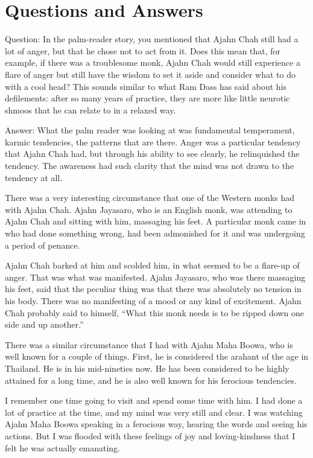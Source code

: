 \chapter{Questions and Answers}

\qaspace
Question: In the palm-reader story, you mentioned that Ajahn Chah still
had a lot of anger, but that he chose not to act from it. Does this mean
that, for example, if there was a troublesome monk, Ajahn Chah would
still experience a flare of anger but still have the wisdom to set it
aside and consider what to do with a cool head? This sounds similar to
what Ram Dass has said about his defilements: after so many years of
practice, they are more like little neurotic shmoos that he can relate
to in a relaxed way.

\qaspace
Answer: What the palm reader was looking at was fundamental temperament,
karmic tendencies, the patterns that are there. Anger was a particular
tendency that Ajahn Chah had, but through his ability to see clearly, he
relinquished the tendency. The awareness had such clarity that the mind
was not drawn to the tendency at all.

There was a very interesting circumstance that one of the Western monks
had with Ajahn Chah. Ajahn Jayasaro, who is an English monk, was
attending to Ajahn Chah and sitting with him, massaging his feet. A
particular monk came in who had done something wrong, had been
admonished for it and was undergoing a period of penance.

Ajahn Chah barked at him and scolded him, in what seemed to be a
flare-up of anger. That was what was manifested. Ajahn Jayasaro, who was
there massaging his feet, said that the peculiar thing was that there
was absolutely no tension in his body. There was no manifesting of a
mood or any kind of excitement. Ajahn Chah probably said to himself,
“What this monk needs is to be ripped down one side and up another.”

There was a similar circumstance that I had with Ajahn Maha Boowa, who
is well known for a couple of things. First, he is considered the
arahant of the age in Thailand. He is in his mid-nineties now. He has
been considered to be highly attained for a long time, and he is also
well known for his ferocious tendencies.

I remember one time going to visit and spend some time with him. I had
done a lot of practice at the time, and my mind was very still and
clear. I was watching Ajahn Maha Boowa speaking in a ferocious way,
hearing the words and seeing his actions. But I was flooded with these
feelings of joy and loving-kindness that I felt he was actually
emanating.

